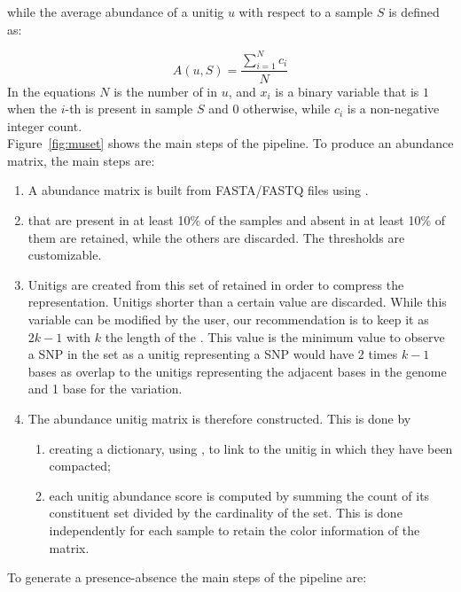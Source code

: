 while the average abundance of a unitig $u$ with respect to a sample $S$ is defined as:

\begin{equation}
	A(u, S) = \frac{\sum_{i=1}^{N}{c_i}}{N}
\end{equation}
In the equations $N$ is the number of \kmers in $u$, and $x_i$ is a binary variable that is $1$ when the $i$-th \kmer is present in sample $S$ and $0$ otherwise, while $c_i$ is a non-negative integer count.\\
Figure~\ref{fig:muset} shows the main steps of the \muset pipeline. To produce an abundance matrix, the main steps are:
\begin{enumerate}
	\item A \kmer abundance matrix is built from FASTA/FASTQ files using \kmt.
	\item \kmers that are present in at least 10\% of the samples and absent in at least 10\% of them are retained, while the others are discarded. The thresholds are customizable.
	\item Unitigs are created from this set of retained \kmers in order to compress the representation. Unitigs shorter than a certain value are discarded. While this variable can be modified by the user, our recommendation is to keep it as $2k-1$ with $k$ the length of the \kmer. This value is the minimum value to observe a SNP in the set as a unitig representing a SNP would have 2 times $k-1$ bases as overlap to the unitigs representing the adjacent bases in the genome and 1 base for the variation.
	\item The abundance unitig matrix is therefore constructed. This is done by 
	\begin{enumerate}
		\item creating a dictionary, using \ssh, to link \kmers to the unitig in which they have been compacted;
		\item each unitig abundance score is computed by summing the count of its constituent \kmer set divided by the cardinality of the set. This is done independently for each sample to retain the color information of the \kmer matrix.
	\end{enumerate} 
\end{enumerate}
To generate a presence-absence the main steps of the pipeline are:
